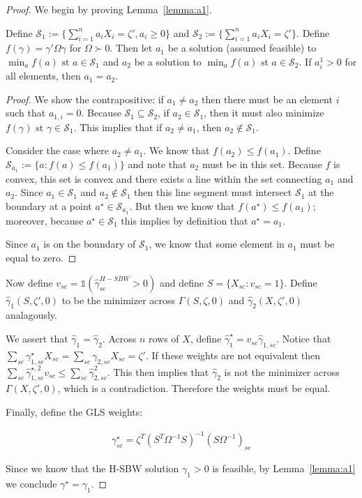 \begin{proof}

We begin by proving Lemma~\ref{lemma:a1}.

\begin{lemma}\label{lemma:a1}
Define $\mathcal{S}_1 := \{\sum_{i=1}^n a_iX_i = \zeta', a_i \ge 0\}$ and $\mathcal{S}_2 := \{\sum_{i=1}^n a_iX_i = \zeta'\}$. Define $f(\gamma) = \gamma'\Omega\gamma$ for $\Omega \succ 0$. Then let $a_1$ be a solution (assumed feasible) to $\min_a f(a) \text{ st } a \in \mathcal{S}_1$ and $a_2$ be a solution to $\min_a f(a) \text{ st } a \in \mathcal{S}_2$. If $a^1_i > 0$ for all elements, then $a_1 = a_2$.
\end{lemma}

\begin{proof}
We show the contrapositive: if $a_1 \ne a_2$ then there must be an element $i$ such that $a_{1, i} = 0$. Because $\mathcal{S}_1 \subseteq \mathcal{S}_2$, if $a_2 \in \mathcal{S}_1$, then it must also minimize $f(\gamma) \text{ st } \gamma \in \mathcal{S}_1$. This implies that if $a_2 \ne a_1$, then $a_2 \not\in \mathcal{S}_1$.

Consider the case where $a_2 \ne a_1$. We know that $f(a_2) \le f(a_1)$. Define $\mathcal{S}_{a_1} := \{a: f(a) \le f(a_1)\}$ and note that $a_2$ must be in this set. Because $f$ is convex, this set is convex and there exists a line within the set connecting $a_1$ and $a_2$. Since $a_1 \in \mathcal{S}_1$ and $a_2 \not\in\mathcal{S}_1$ then this line segment must intersect $\mathcal{S}_1$ at the boundary at a point $a^\star \in \mathcal{S}_{a_1}$. But then we know that $f(a^\star) \le f(a_1)$; moreover, because $a^\star \in \mathcal{S}_1$ this implies by definition that $a^\star = a_1$. 

Since $a_1$ is on the boundary of $\mathcal{S}_1$, we know that some element in $a_1$ must be equal to zero. 
\end{proof}

Now define $v_{sc} = \mathds{1}(\hat{\gamma}_{sc}^{H-SBW} > 0)$ and define $S = \{X_{sc}: v_{sc} = 1\}$. Define $\hat{\gamma}_1(S, \zeta', 0)$ to be the minimizer across $\Gamma(S, \zeta, 0)$ and $\hat{\gamma}_2(X, \zeta', 0)$ analagously. 

We assert that $\hat{\gamma}_1 = \hat{\gamma}_2$. Across $n$ rows of $X$, define $\hat{\gamma}_1^\star = v_{sc}\hat{\gamma}_{1, sc}$. Notice that $\sum_{sc}\gamma_{1, sc}^\star X_{sc} = \sum_{sc}\gamma_{2, sc} X_{sc} = \zeta'$. If these weights are not equivalent then $\sum_{sc}\hat{\gamma}_{1, sc}^{\star, 2}v_{sc}\le \sum_{sc}\hat{\gamma}_{2, sc}^2$. This then implies that $\hat{\gamma}_2$ is not the minimizer across $\Gamma(X, \zeta', 0)$, which is a contradiction. Therefore the weights must be equal.

Finally, define the GLS weights:

\begin{align*}
    \gamma_{sc}^\star = \zeta^T(S^T\Omega^{-1}S)^{-1}(S\Omega^{-1})_{sc}
\end{align*}

Since we know that the H-SBW solution $\gamma_1 > 0$ is feasible, by Lemma~\ref{lemma:a1} we conclude $\gamma^\star = \gamma_1$.
\end{proof}

